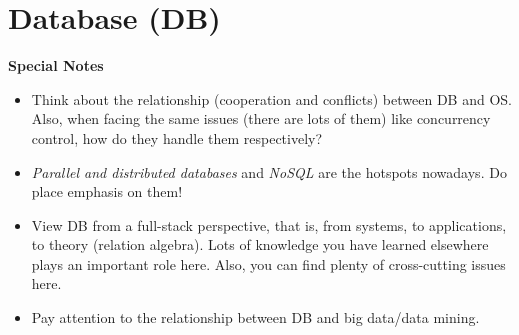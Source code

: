 \documentclass{article}
\begin{document}
\section{Database (DB)}
\textbf{Special Notes}
\begin{itemize}
    \item Think about the relationship (cooperation and conflicts) between DB and OS.
    Also, when facing the same issues (there are lots of them) like concurrency control, how do they handle them respectively?
    \item \emph{Parallel and distributed databases} and \emph{NoSQL} are the hotspots nowadays.
    Do place emphasis on them!
    \item View DB from a full-stack perspective, that is, from systems, to applications, to theory (relation algebra).
    Lots of knowledge you have learned elsewhere plays an important role here.
    Also, you can find plenty of cross-cutting issues here.
    \item Pay attention to the relationship between DB and big data/data mining.
\end{itemize}
\end{document}
